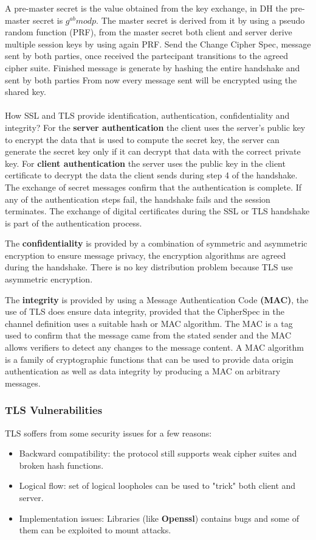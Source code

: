     A pre-master secret is the value obtained from the key exchange, in DH the pre-master secret is $g^{ab} mod p$. The master secret is derived from it by using a pseudo random function (PRF), from the master secret both client and server derive multiple session keys by using again PRF.
    Send the Change Cipher Spec, message sent by both parties, once received the partecipant transitions to the agreed cipher suite. Finished message is generate by hashing the entire handshake and sent by both parties
    From now every message sent will be encrypted using the shared key.
    \\\\
    How SSL and TLS provide identification, authentication, confidentiality and integrity? For the \textbf{server authentication} the client uses the server's public key to encrypt the data that is used to compute the secret key, the server can generate the secret key only if it can decrypt that data with the correct private key. For \textbf{client authentication} the server uses the public key in the client certificate to decrypt the data the client sends during step 4 of the handshake. The exchange of secret messages confirm that the authentication is complete. If any of the authentication steps fail, the handshake fails and the session terminates. The exchange of digital certificates during the SSL or TLS handshake is part of the authentication process.
    
    The \textbf{confidentiality} is provided by a combination of symmetric and asymmetric encryption to ensure message privacy, the encryption algorithms are agreed during the handshake. There is no key distribution problem because TLS use asymmetric encryption.
    
    The \textbf{integrity} is provided by using a Message Authentication Code \textbf{(MAC)}, the use of TLS does ensure data integrity, provided that the CipherSpec in the channel definition uses a suitable hash or MAC algorithm. The MAC is a tag used to confirm that the message came from the stated sender and the MAC allows verifiers to detect any changes to the message content. A MAC algorithm is a family of cryptographic functions that can be used to provide data origin authentication as well as data integrity by producing a MAC on arbitrary messages.
    
    \subsubsection{TLS Vulnerabilities}
    TLS soffers from some security issues for a few reasons:
    \begin{itemize}
        \item Backward compatibility: the protocol still supports weak cipher suites and broken hash functions.
        \item Logical flow: set of logical loopholes can be used to "trick" both client and server.
        \item Implementation issues: Libraries (like \textbf{Openssl}) contains bugs and some of them can be exploited to mount attacks.
    \end{itemize}   
    
